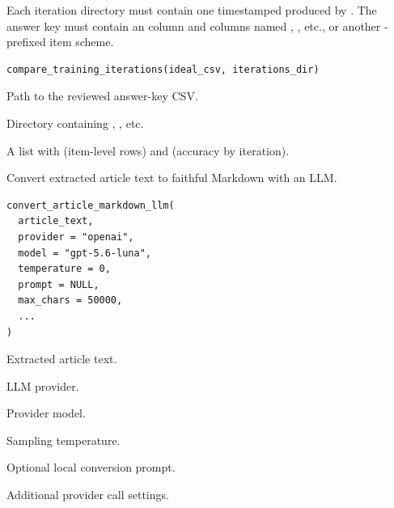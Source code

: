 \documentclass[a4paper]{book}
\begin{document}
%
\begin{Description}
Each iteration directory must contain one timestamped 
produced by . The answer key must contain an  column and
columns named , , etc., or another -prefixed item scheme.
\end{Description}
%
\begin{Usage}
\begin{verbatim}
compare_training_iterations(ideal_csv, iterations_dir)
\end{verbatim}
\end{Usage}
%
\begin{Arguments}
\begin{ldescription}
\item[\code{ideal\_csv}] Path to the reviewed answer-key CSV.

\item[\code{iterations\_dir}] Directory containing , , etc.
\end{ldescription}
\end{Arguments}
%
\begin{Value}
A list with  (item-level rows) and  (accuracy by
iteration).
\end{Value}
%
\begin{Description}
Convert extracted article text to faithful Markdown with an LLM.
\end{Description}
%
\begin{Usage}
\begin{verbatim}
convert_article_markdown_llm(
  article_text,
  provider = "openai",
  model = "gpt-5.6-luna",
  temperature = 0,
  prompt = NULL,
  max_chars = 50000,
  ...
)
\end{verbatim}
\end{Usage}
%
\begin{Arguments}
\begin{ldescription}
\item[\code{article\_text}] Extracted article text.

\item[\code{provider}] LLM provider.

\item[\code{model}] Provider model.

\item[\code{temperature}] Sampling temperature.

\item[\code{prompt}] Optional local conversion prompt.

\item[\code{...}] Additional provider call settings.
\end{ldescription}
\end{Arguments}
\end{document}
